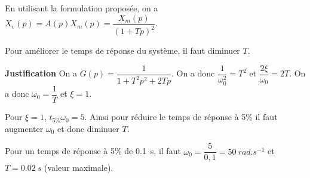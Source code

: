 \ifprof
\begin{corrige}
%
%
%
%
%
%

En utilisant la formulation proposée, on a $X_v(p) = A(p)X_m(p)  =\dfrac{X_m(p) }{\left(1+Tp\right)^2} $.

Pour améliorer le temps de réponse du système, il faut diminuer $T$. 

\textbf{Justification}
On a $G(p)=\dfrac{1}{1+T^2p^2 +2Tp}$. On a donc $\dfrac{1}{\omega_0^2}=T^2$ et $\dfrac{2\xi}{\omega_0}=2T$. On a donc $\omega_0=\dfrac{1}{T}$ et $\xi = 1$.

Pour $\xi=1$, $t_{5\%}\omega_0 = 5$. Ainsi pour réduire le temps de réponse à 5\% il faut augmenter $\omega_0$ et donc diminuer $T$.

Pour un temps de réponse à 5\% de \SI{0,1}{s}, il faut $\omega_0 = \dfrac{5}{0,1}=\SI{50}{rad.s^{-1}}$ et $T=\SI{0,02}{s}$ (valeur maximale).

\end{corrige}
\else
\fi

